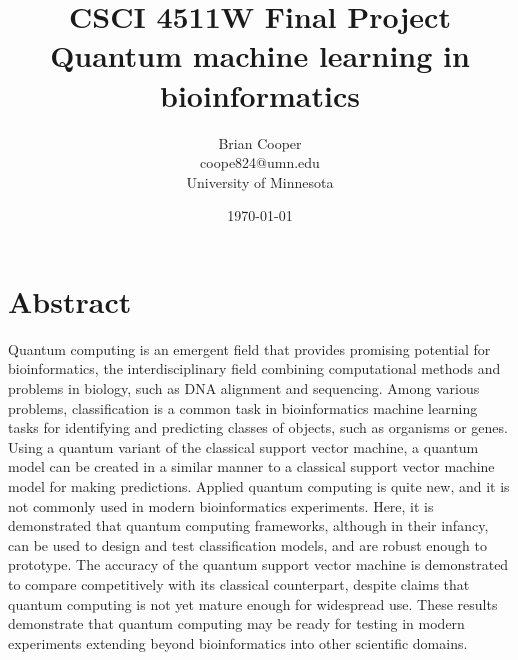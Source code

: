 \documentclass{article}
\title{%
  CSCI 4511W Final Project \\
  \large Quantum machine learning in bioinformatics
}
\author{Brian Cooper \\ coope824@umn.edu \\ University of Minnesota}
\date{\today}
\begin{document}
\maketitle

\section*{Abstract}
  Quantum computing is an emergent field that provides promising potential for bioinformatics, the interdisciplinary field combining computational methods and problems in biology, such as DNA alignment and sequencing. Among various problems, classification is a common task in bioinformatics machine learning tasks for identifying and predicting classes of objects, such as organisms or genes. Using a quantum variant of the classical support vector machine, a quantum model can be created in a similar manner to a classical support vector machine model for making predictions. Applied quantum computing is quite new, and it is not commonly used in modern bioinformatics experiments. Here, it is demonstrated that quantum computing frameworks, although in their infancy, can be used to design and test classification models, and are robust enough to prototype. The accuracy of the quantum support vector machine is demonstrated to compare competitively with its classical counterpart, despite claims that quantum computing is not yet mature enough for widespread use. These results demonstrate that quantum computing may be ready for testing in modern experiments extending beyond bioinformatics into other scientific domains.
\end{document}

